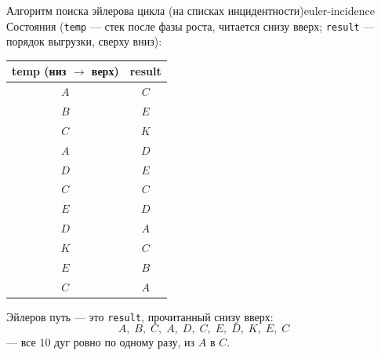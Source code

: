 \begin{algo}{Алгоритм поиска эйлерова цикла (на списках инцидентности)}{euler-incidence}
\medskip
\noindent Состояния (\texttt{temp} --- стек после фазы роста, читается
снизу вверх; \texttt{result} --- порядок выгрузки, сверху вниз):

\medskip
\begin{center}
\begin{tabular}{c|c}
\textbf{temp} (низ $\to$ верх) & \textbf{result} \\ \hline
$A$ & $C$ \\
$B$ & $E$ \\
$C$ & $K$ \\
$A$ & $D$ \\
$D$ & $E$ \\
$C$ & $C$ \\
$E$ & $D$ \\
$D$ & $A$ \\
$K$ & $C$ \\
$E$ & $B$ \\
$C$ & $A$ \\
\end{tabular}
\end{center}

\medskip
Эйлеров путь --- это \texttt{result}, прочитанный снизу вверх:
\[
  A,\; B,\; C,\; A,\; D,\; C,\; E,\; D,\; K,\; E,\; C
\]
--- все $10$ дуг ровно по одному разу, из $A$ в $C$.
\end{algo}

